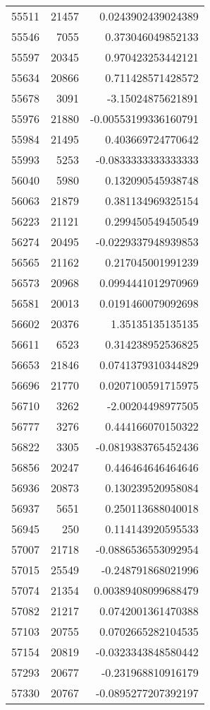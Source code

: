 \begin{tabular}{r | r | r}
55511 & 21457 & 0.0243902439024389 \\
55546 & 7055 & 0.373046049852133 \\
55597 & 20345 & 0.970423253442121 \\
55634 & 20866 & 0.711428571428572 \\
55678 & 3091 & -3.15024875621891 \\
55976 & 21880 & -0.00553199336160791 \\
55984 & 21495 & 0.403669724770642 \\
55993 & 5253 & -0.0833333333333333 \\
56040 & 5980 & 0.132090545938748 \\
56063 & 21879 & 0.381134969325154 \\
56223 & 21121 & 0.299450549450549 \\
56274 & 20495 & -0.0229337948939853 \\
56565 & 21162 & 0.217045001991239 \\
56573 & 20968 & 0.0994441012970969 \\
56581 & 20013 & 0.0191460079092698 \\
56602 & 20376 & 1.35135135135135 \\
56611 & 6523 & 0.314238952536825 \\
56653 & 21846 & 0.0741379310344829 \\
56696 & 21770 & 0.0207100591715975 \\
56710 & 3262 & -2.00204498977505 \\
56777 & 3276 & 0.444166070150322 \\
56822 & 3305 & -0.0819383765452436 \\
56856 & 20247 & 0.446464646464646 \\
56936 & 20873 & 0.130239520958084 \\
56937 & 5651 & 0.250113688040018 \\
56945 & 250 & 0.114143920595533 \\
57007 & 21718 & -0.0886536553092954 \\
57015 & 25549 & -0.248791868021996 \\
57074 & 21354 & 0.00389408099688479 \\
57082 & 21217 & 0.0742001361470388 \\
57103 & 20755 & 0.0702665282104535 \\
57154 & 20819 & -0.0323343848580442 \\
57293 & 20677 & -0.231968810916179 \\
57330 & 20767 & -0.0895277207392197 \\

\end{tabular}
